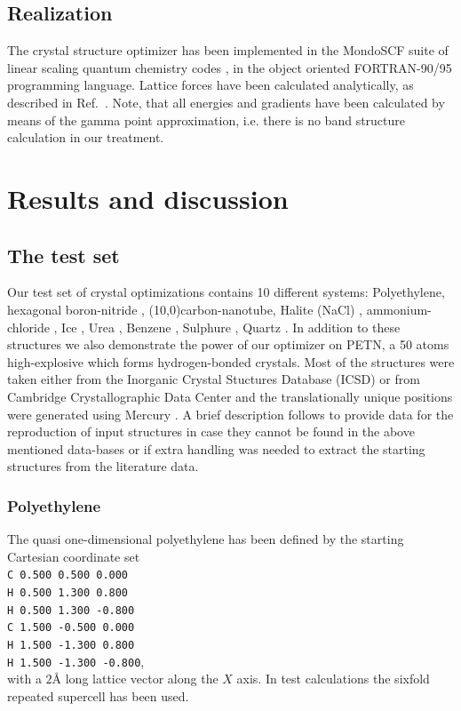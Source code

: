 \documentclass[prl,aps,preprint,superbib,12pt]{revtex4}
\begin{document}
\subsection{Realization}
The crystal structure optimizer has been implemented in the
MondoSCF suite of linear scaling quantum chemistry codes 
\cite{MondoSCF}, in the object oriented 
FORTRAN-90/95 programming language.
Lattice forces have been calculated analytically, as described in 
Ref.~\cite{CJTymczak04LatF}. Note, that all energies and gradients
have been calculated by means of the gamma point approximation,
i.e. there is no band structure calculation in our treatment.

\section{Results and discussion} \label{ResDissc}
\subsection{The test set}
Our test set of crystal optimizations contains
10 different systems:
Polyethylene, hexagonal boron-nitride , (10,0)carbon-nanotube,
Halite (NaCl) \cite{whbragg13}, 
ammonium-chloride \cite{DBSirdeshmukh70},
Ice \cite{AGoto90}, Urea \cite{SSwaminathan84}, 
Benzene \cite{GJeffrey87}, Sulphure \cite{ACGallacher92}, 
Quartz \cite{MGTucker01}. In addition to these structures
we also demonstrate the power of our optimizer
on PETN, a 50 atoms high-explosive \cite{Trotter_1963v16,Conant_1979}
which forms hydrogen-bonded crystals.
Most of the structures were
taken either from the Inorganic Crystal Stuctures Database
(ICSD) \cite{ICSD} or from Cambridge Crystallographic Data Center
\cite{CCDC} and the translationally unique positions were
generated using Mercury \cite{Mercury}. 
A brief description follows to provide data for the reproduction
of input structures in case they cannot be found
in the above mentioned data-bases or if extra handling was needed to 
extract the starting structures from the literature data.

\subsubsection{Polyethylene}
The quasi one-dimensional polyethylene has been defined 
by the starting Cartesian coordinate set
\\
{\tt C    0.500   0.500   0.000} \\
{\tt H    0.500   1.300   0.800} \\
{\tt H    0.500   1.300  -0.800} \\
{\tt C    1.500  -0.500   0.000} \\
{\tt H    1.500  -1.300   0.800} \\
{\tt H    1.500  -1.300  -0.800}, \\
with a $2${\AA} long lattice vector along the $X$ axis. In test
calculations the sixfold repeated supercell has been used.
\end{document}
